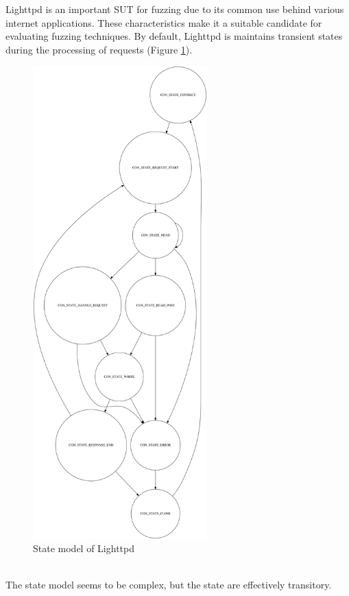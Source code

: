 Lighttpd is an important SUT for fuzzing due to its common use behind various internet applications.
These characteristics make it a suitable candidate for evaluating fuzzing techniques.
By default, Lighttpd is maintains transient states during the processing of requests (Figure \ref{fig:lighttpdstatemodel}).
\begin{figure}[H]
    \centering
    \includegraphics[width=0.6\textwidth]{Images/lighttpd_original.png}
    \caption{State model of Lighttpd}
    \label{fig:lighttpdstatemodel}
\end{figure}
\phantom{}\\
The state model seems to be complex, but the state are effectively transitory.
